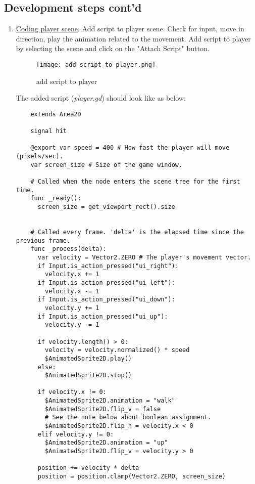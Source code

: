 \subsection{Development steps cont'd}
\begin{enumerate}[resume]
  \item \href{https://docs.godotengine.org/en/stable/getting_started/first_2d_game/03.coding_the_player.html}{\color{blue}Coding player scene}. 
  Add script to player scene. Check for input, move in direction, play the animation related
  to the movement.
  Add script to player by selecting the scene and click on the "Attach Script" button.
  \begin{figure}[H]
    \centering
    \texttt{[image: add-script-to-player.png]}
      \caption{add script to player}
      \label{fig:add-script-to-player}
  \end{figure}
  The added script (\textit{player.gd}) should look like as below:
  \begin{verbatim}
    extends Area2D

    signal hit

    @export var speed = 400 # How fast the player will move (pixels/sec).
    var screen_size # Size of the game window.
    
    # Called when the node enters the scene tree for the first time.
    func _ready():
      screen_size = get_viewport_rect().size
    
    
    # Called every frame. 'delta' is the elapsed time since the previous frame.
    func _process(delta):
      var velocity = Vector2.ZERO # The player's movement vector.
      if Input.is_action_pressed("ui_right"):
        velocity.x += 1
      if Input.is_action_pressed("ui_left"):
        velocity.x -= 1
      if Input.is_action_pressed("ui_down"):
        velocity.y += 1
      if Input.is_action_pressed("ui_up"):
        velocity.y -= 1
    
      if velocity.length() > 0:
        velocity = velocity.normalized() * speed
        $AnimatedSprite2D.play()
      else:
        $AnimatedSprite2D.stop()
      
      if velocity.x != 0:
        $AnimatedSprite2D.animation = "walk"
        $AnimatedSprite2D.flip_v = false
        # See the note below about boolean assignment.
        $AnimatedSprite2D.flip_h = velocity.x < 0
      elif velocity.y != 0:
        $AnimatedSprite2D.animation = "up"
        $AnimatedSprite2D.flip_v = velocity.y > 0
      
      position += velocity * delta
      position = position.clamp(Vector2.ZERO, screen_size)  
      

\end{verbatim}
\end{enumerate}
